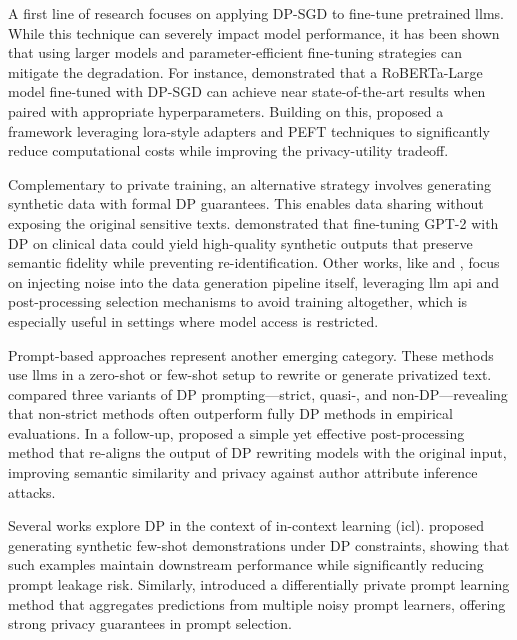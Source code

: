 A first line of research focuses on applying DP-SGD to fine-tune pretrained \glspl{llm}. While this technique can severely impact model performance, it has been shown that using larger models and parameter-efficient fine-tuning strategies can mitigate the degradation. For instance, \citet{li2022large} demonstrated that a RoBERTa-Large model fine-tuned with DP-SGD can achieve near state-of-the-art results when paired with appropriate hyperparameters. Building on this, \citet{yu2022differentially} proposed a framework leveraging \gls{lora}-style adapters and PEFT techniques to significantly reduce computational costs while improving the privacy-utility tradeoff.

Complementary to private training, an alternative strategy involves generating synthetic data with formal DP guarantees. This enables data sharing without exposing the original sensitive texts. \citet{mattern-etal-2022-differentially} demonstrated that fine-tuning GPT-2 with DP on clinical data could yield high-quality synthetic outputs that preserve semantic fidelity while preventing re-identification. Other works, like \citet{nahidSafeSynthDPLeveragingLarge2024} and \citet{xieDifferentiallyPrivateSynthetic2024}, focus on injecting noise into the data generation pipeline itself, leveraging \gls{llm} \gls{api} and post-processing selection mechanisms to avoid training altogether, which is especially useful in settings where model access is restricted.

Prompt-based approaches represent another emerging category. These methods use \glspl{llm} in a zero-shot or few-shot setup to rewrite or generate privatized text. \citet{meisenbacherThinkingOutsideDifferential2024} compared three variants of DP prompting—strict, quasi-, and non-DP—revealing that non-strict methods often outperform fully DP methods in empirical evaluations. In a follow-up, \citet{igamberdiev2024rewriteagain} proposed a simple yet effective post-processing method that re-aligns the output of DP rewriting models with the original input, improving semantic similarity and privacy against author attribute inference attacks.

Several works explore DP in the context of in-context learning (\gls{icl}). \citet{tangPrivacyPreservingInContextLearning2023} proposed generating synthetic few-shot demonstrations under DP constraints, showing that such examples maintain downstream performance while significantly reducing prompt leakage risk. Similarly, \citet{duan2023flocks} introduced a differentially private prompt learning method that aggregates predictions from multiple noisy prompt learners, offering strong privacy guarantees in prompt selection.

